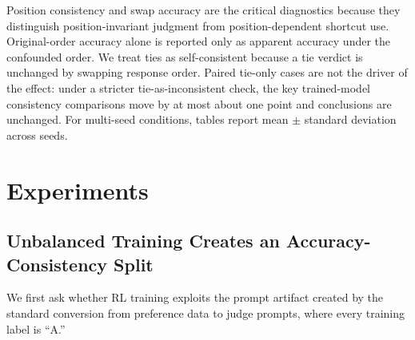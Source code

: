 \documentclass[letterpaper]{article}
\begin{document}
Position consistency and swap accuracy are the critical diagnostics because they distinguish position-invariant judgment from position-dependent shortcut use. Original-order accuracy alone is reported only as apparent accuracy under the confounded order. We treat ties as self-consistent because a tie verdict is unchanged by swapping response order. Paired tie-only cases are not the driver of the effect: under a stricter tie-as-inconsistent check, the key trained-model consistency comparisons move by at most about one point and conclusions are unchanged. For multi-seed conditions, tables report mean $\pm$ standard deviation across seeds.

\section{Experiments}

\subsection{Unbalanced Training Creates an Accuracy-Consistency Split}

We first ask whether RL training exploits the prompt artifact created by the standard conversion from preference data to judge prompts, where every training label is ``A.''
\end{document}
